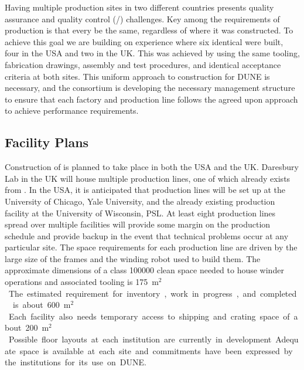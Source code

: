 Having multiple  production sites in two different countries presents quality assurance and quality control (/) challenges. Key among the requirements of production is that every  be the same, regardless of where it was constructed. To achieve this goal we are building on  experience where six identical  were built, four in the USA and two in the UK. This was achieved by using the same tooling, fabrication drawings, assembly and test procedures, and identical acceptance criteria at both sites.  This uniform approach to construction for DUNE is necessary, and the  consortium is developing the necessary management structure to ensure that each factory and production line follows the agreed upon approach to achieve  performance requirements.


\subsection{Facility Plans}
\label{sec:fdsp-apa-facility}

Construction of   is planned to take place in both the USA and the UK. Daresbury Lab in the UK will house multiple production lines, one of which already exists from . In the USA, it is anticipated that production lines will be set up at the University of Chicago, Yale University, and the already existing production facility at the University of Wisconsin, PSL. At least eight  production lines spread over multiple facilities will provide some margin on the production schedule and provide backup in the event that technical problems occur at any particular site. 
The space requirements for each production line are driven by the large size of the  frames and the winding robot used to build them. The approximate dimensions of a class \num{100000} clean space needed to house winder operations and associated tooling is \SI{175}{m$^2$}. The estimated requirement for inventory, work in progress, and completed  is about \SI{600}{m$^2$}. Each facility  also needs temporary access to shipping and crating space of about \SI{200}{m$^2$}. Possible floor layouts at each institution are currently in development. Adequate space is available at each site and commitments have been expressed by the institutions for its use on DUNE. 


